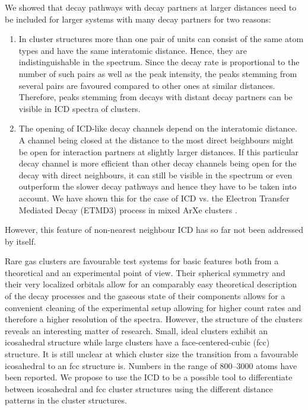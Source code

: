 We showed that decay pathways with decay partners at larger distances need to
be included for larger systems with many decay partners for two reasons:
\begin{enumerate}
 \item In cluster structures more than one pair of units can consist of
       the same atom types and have the same interatomic distance. Hence,
       they are indistinguishable in the spectrum. Since the decay rate
       is proportional to the number of such pairs as well as the peak
       intensity, the peaks stemming from several pairs are favoured
       compared to other ones at similar distances. Therefore, peaks
       stemming from decays with distant decay partners can be visible
       in ICD spectra of clusters. \cite{Fasshauer14_1}
 \item The opening of ICD-like decay channels depend on the interatomic
       distance. A channel being closed at the distance to the most direct
       beighbours might be open for interaction partners at slightly
       larger distances. If this particular decay channel is more efficient
       than other decay channels being open for the decay with direct
       neighbours, it can still be visible in the spectrum or even
       outperform the slower decay pathways and hence they have to be
       taken into account. We have shown this for the case of ICD vs.
       the Electron Transfer Mediated Decay (ETMD3) process in mixed ArXe
       clusters \cite{Fasshauer13,Fasshauer15_2}.
\end{enumerate}
However, this feature of non-nearest neighbour ICD
has so far not been addressed by itself.

Rare gas clusters are favourable test systems for basic features both
from a theoretical and an experimental point of view. Their spherical
symmetry and their very localized orbitals allow for an comparably easy
theoretical description of the decay processes and the gaseous state
of their components allows for a convenient cleaning of the experimental
setup allowing for higher count rates and therefore a higher resolution
of the spectra. However, the structure of the clusters reveals an
interesting matter of research. Small, ideal clusters exhibit an icosahedral
structure while large clusters have a face-centered-cubic (fcc) structure.
It is still unclear at which cluster size the transition from a favourable
icosahedral to an fcc structure is. Numbers in the range of 800--3000 atoms
have been reported. \cite{}
We propose to use the ICD to be a possible tool to differentiate between
icosahedral and fcc cluster structures using the different distance
patterns in the cluster structures.

